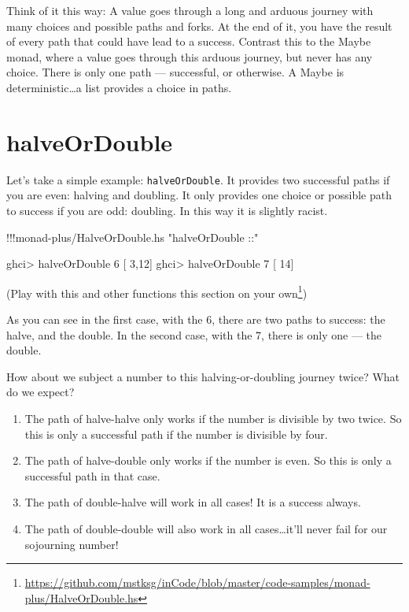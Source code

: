 \documentclass[]{article}
\newenvironment{Shaded}{}{}
\newcommand{\DecValTok}[1]{\textcolor[rgb]{0.25,0.63,0.44}{{#1}}}
\newcommand{\StringTok}[1]{\textcolor[rgb]{0.25,0.44,0.63}{{#1}}}
\newcommand{\FunctionTok}[1]{\textcolor[rgb]{0.02,0.16,0.49}{{#1}}}
\newcommand{\NormalTok}[1]{{#1}}
\renewcommand{\href}[2]{#2\footnote{\url{#1}}}
\begin{document}
Think of it this way: A value goes through a long and arduous journey
with many choices and possible paths and forks. At the end of it, you
have the result of every path that could have lead to a success.
Contrast this to the Maybe monad, where a value goes through this
arduous journey, but never has any choice. There is only one path ---
successful, or otherwise. A Maybe is deterministic\ldots{}a list
provides a choice in paths.

\section{halveOrDouble}\label{halveordouble}

Let's take a simple example: \texttt{halveOrDouble}. It provides two
successful paths if you are even: halving and doubling. It only provides
one choice or possible path to success if you are odd: doubling. In this
way it is slightly racist.

\begin{Shaded}
\begin{Highlighting}[]
\FunctionTok{!!!}\NormalTok{monad}\FunctionTok{-}\NormalTok{plus}\FunctionTok{/}\NormalTok{HalveOrDouble.hs }\StringTok{"halveOrDouble ::"}
\end{Highlighting}
\end{Shaded}

\begin{Shaded}
\begin{Highlighting}[]
\NormalTok{ghci}\FunctionTok{>} \NormalTok{halveOrDouble }\DecValTok{6}
\NormalTok{[ }\DecValTok{3}\NormalTok{,}\DecValTok{12}\NormalTok{]}
\NormalTok{ghci}\FunctionTok{>} \NormalTok{halveOrDouble }\DecValTok{7}
\NormalTok{[   }\DecValTok{14}\NormalTok{]}
\end{Highlighting}
\end{Shaded}

(\href{https://github.com/mstksg/inCode/blob/master/code-samples/monad-plus/HalveOrDouble.hs}{Play
with this and other functions this section on your own})

As you can see in the first case, with the 6, there are two paths to
success: the halve, and the double. In the second case, with the 7,
there is only one --- the double.

How about we subject a number to this halving-or-doubling journey twice?
What do we expect?

\begin{enumerate}
\def\labelenumi{\arabic{enumi}.}
\tightlist
\item
  The path of halve-halve only works if the number is divisible by two
  twice. So this is only a successful path if the number is divisible by
  four.
\item
  The path of halve-double only works if the number is even. So this is
  only a successful path in that case.
\item
  The path of double-halve will work in all cases! It is a success
  always.
\item
  The path of double-double will also work in all cases\ldots{}it'll
  never fail for our sojourning number!
\end{enumerate}
\end{document}
